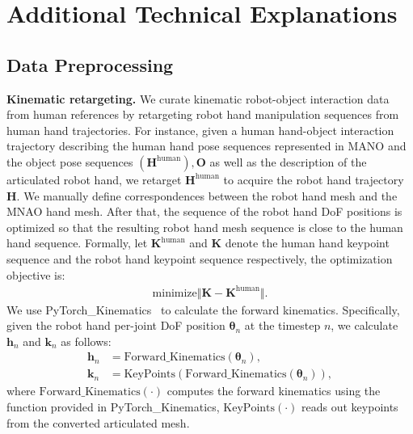 \section{Additional Technical Explanations} \label{sec:supp_method}

\subsection{Data Preprocessing} \label{sec:supp_method_dta_preprocess}



\noindent\textbf{Kinematic retargeting. } 
We curate kinematic robot-object interaction data from human references by retargeting robot hand manipulation sequences from human hand trajectories. For instance, given a human hand-object interaction trajectory describing the human hand pose sequences represented in MANO and the object pose sequences $(\mathbf{H}^{\text{human}}), \mathbf{O}$ as well as the description of the articulated robot hand, we retarget $\mathbf{H}^{\text{human}}$ to acquire the robot hand trajectory $\mathbf{H}$. We manually define correspondences between the robot hand mesh and the MNAO hand mesh. After that, the sequence of the robot hand DoF positions is optimized so that the resulting robot hand mesh sequence is close to the human hand sequence. Formally, let $\mathbf{K}^{\text{human}}$ and $\mathbf{K}$ denote the human hand keypoint sequence and the robot hand keypoint sequence respectively, the optimization objective is:
\begin{align}
    \text{minimize} \Vert \mathbf{K} - \mathbf{K}^{\text{human}} \Vert. 
\end{align}
We use PyTorch\_Kinematics~\citep{Zhong_PyTorch_Kinematics_2024} to calculate the forward kinematics. Specifically, given the robot hand per-joint DoF position $\mathbf{\theta}_n$ at the timestep $n$, we calculate $\mathbf{h}_n$ and $\mathbf{k}_n$ as follows:
\begin{align}
    \mathbf{h}_n &= \text{Forward\_Kinematics}(\mathbf{\theta}_n), \\
    \mathbf{k}_n &= \text{KeyPoints}(\text{Forward\_Kinematics}(\mathbf{\theta}_n)),
\end{align}
where $\text{Forward\_Kinematics}(\cdot)$ computes the forward kinematics using the function provided in PyTorch\_Kinematics, $\text{KeyPoints}(\cdot)$ reads out keypoints from the converted articulated mesh. 




